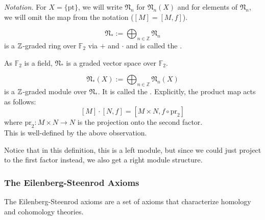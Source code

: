\documentclass[a4paper,12pt]{article}
\begin{document}

\noindent\textit{Notation.} For \(X=\{\mathrm{pt}\}\), we will write \(\mathfrak{N}_n\) for \(\mathfrak{N}_n(X)\) and for elements of \(\mathfrak{N}_n\), we will omit the map from the notation (\([M]=[M,f]\)).

\begin{definition}\label{bordism ring}
    \[\mathfrak{N}_\ast:=\bigoplus_{n\in\mathbb{Z}}\mathfrak{N}_n\]
    is a \(\mathbb{Z}\)-graded ring over \(\mathbb{F}_2\) via \(+\) and \(\cdot\) and is called the .
\end{definition}

\begin{remark}
    As \(\mathbb{F}_2\) is a field, \(\mathfrak{N}_\ast\) is a graded vector space over \(\mathbb{F}_2\).
\end{remark}


\begin{definition}\label{bordism module}
    \[\mathfrak{N}_\ast(X):=\bigoplus_{n\in\mathbb{Z}}\mathfrak{N}_n(X)\]
    is a \(\mathbb{Z}\)-graded module over \(\mathfrak{N}_\ast\). It is called the . Explicitly, the product map acts as follows:
    \[[M]\cdot[N,f]=[M\times N, f\circ \mathrm{pr}_2]\]
    where \(\mathrm{pr}_2:M\times N\to N\) is the projection onto the second factor.\\
    This is well-defined by the above observation.
\end{definition}

\begin{remark}
    Notice that in this definition, this is a left module, but since we could just project to the first factor instead, we also get a right module structure.
\end{remark}

\subsubsection{The Eilenberg-Steenrod Axioms}\label{es axioms}
The Eilenberg-Steenrod axioms are a set of axioms that characterize homology and cohomology theories.
\end{document}
